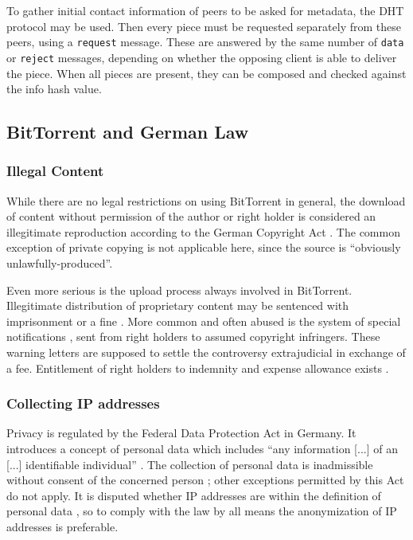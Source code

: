 \documentclass[10pt, a4paper]{scrartcl} %
\renewcommand{\_}{\origunderscore\allowbreak}
\begin{document}
To gather initial contact information of peers to be asked for metadata, the DHT protocol may be used. Then every piece must be requested separately from these peers, using a \texttt{request} message. These are answered by the same number of \texttt{data} or \texttt{reject} messages, depending on whether the opposing client is able to deliver the piece. When all pieces are present, they can be composed and checked against the info hash value.

\subsection{BitTorrent and German Law}
\subsubsection{Illegal Content}
While there are no legal restrictions on using BitTorrent in general, the download of content without permission of the author or right holder is considered an illegitimate reproduction according to the German Copyright Act \cite[art.~15\,(1),~16]{urhg}. The common exception of private copying \cite[art.~53]{urhg} is not applicable here, since the source is ``obviously unlawfully-produced''.

Even more serious is the upload process always involved in BitTorrent. Illegitimate distribution of proprietary content may be sentenced with imprisonment or a fine \cite[art.~106]{urhg}. More common and often abused \cite{abmahnung} is the system of special notifications \cite[art.~97a]{urhg}, sent from right holders to assumed copyright infringers. These warning letters are supposed to settle the controversy extrajudicial in exchange of a fee. Entitlement of right holders to indemnity and expense allowance exists \cite[art.~97]{urhg}.

\subsubsection{Collecting IP addresses}
Privacy is regulated by the Federal Data Protection Act \cite{bdsg} in Germany. It introduces a concept of personal data which includes ``any information [...] of an [...] identifiable individual'' \cite[sec.~3\,(1)]{bdsg}. The collection of personal data is inadmissible without consent of the concerned person \cite[sec.~4]{bdsg}; other exceptions permitted by this Act do not apply. It is disputed whether IP addresses are within the definition of personal data \cite{ip}, so to comply with the law by all means the anonymization of IP addresses is preferable.
\end{document}
